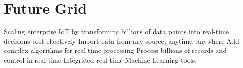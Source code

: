 \section{Future Grid}
Scaling enterprise IoT by transforming billions of data points into real-time
decisions cost effectively
Import data from any source, anytime, anywhere
Add complex algorithms for real-time processing
Process billions of records and control in real-time
Integrated real-time Machine Learning tools\cite{www-futuregrid}.
